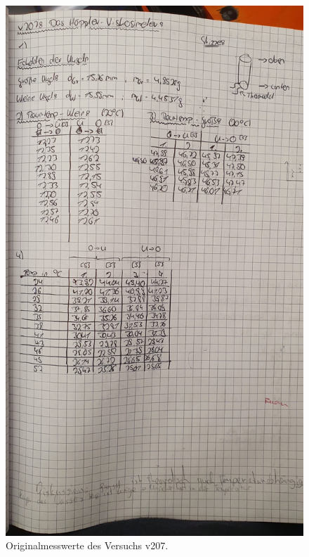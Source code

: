 \begin{figure}
    \centering
    \includegraphics[width=\textwidth]{./content/Originalwerte.JPG}
    \caption{Originalmesswerte des Versuchs v207.}
\end{figure}

%
